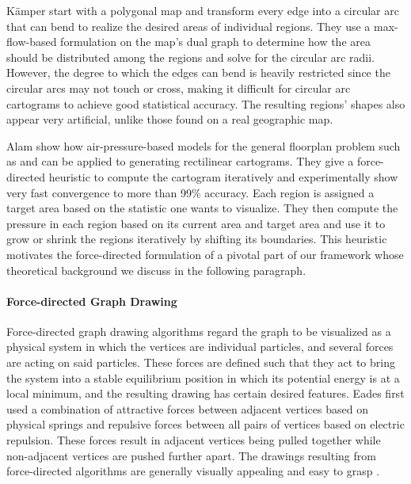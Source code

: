 Kämper \etal{} \cite{kamper2013circular} start with a polygonal map and transform every edge into a circular arc that can bend to realize the desired areas of individual regions.
They use a max-flow-based formulation on the map's dual graph to determine how the area should be distributed among the regions and solve for the circular arc radii.
However, the degree to which the edges can bend is heavily restricted since the circular arcs may not touch or cross, making it difficult for circular arc cartograms to achieve good statistical accuracy.
The resulting regions' shapes also appear very artificial, unlike those found on a real geographic map.

Alam \etal{} \cite{alam2013computing} show how air-pressure-based models for the general floorplan problem such as \cite{izumi1998air} and \cite{felsner2013exploiting} can be applied to generating rectilinear cartograms.
They give a force-directed heuristic to compute the cartogram iteratively and experimentally show very fast convergence to more than 99\% accuracy.
Each region is assigned a target area based on the statistic one wants to visualize.
They then compute the pressure in each region based on its current area and target area and use it to grow or shrink the regions iteratively by shifting its boundaries.
This heuristic motivates the force-directed formulation of a pivotal part of our framework whose theoretical background we discuss in the following paragraph.


\paragraph{Force-directed Graph Drawing}

Force-directed graph drawing algorithms regard the graph to be visualized as a physical system in which the vertices are individual particles, and several forces are acting on said particles.
These forces are defined such that they act to bring the system into a stable equilibrium position in which its potential energy is at a local minimum, and the resulting drawing has certain desired features.
Eades \cite{eades84heuristic} first used a combination of attractive forces between adjacent vertices based on physical springs and repulsive forces between all pairs of vertices based on electric repulsion.
These forces result in adjacent vertices being pulled together while non-adjacent vertices are pushed further apart.
The drawings resulting from force-directed algorithms are generally visually appealing and easy to grasp \cite{kobourov2013force}.

